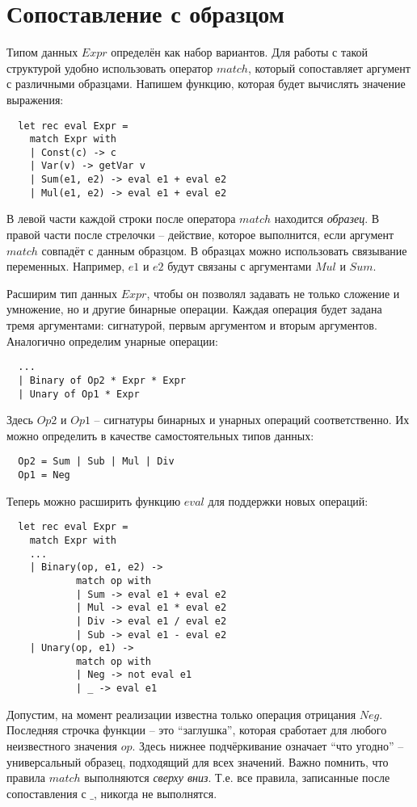 \documentclass[a4paper,11pt]{article}
\begin{document}
\section{Сопоставление с образцом}
Типом данных $Expr$ определён как набор вариантов. Для работы с такой структурой
удобно использовать оператор $match$, который сопоставляет аргумент с различными
образцами. Напишем функцию, которая будет вычислять значение выражения:
\begin{lstlisting}
  let rec eval Expr =
    match Expr with
    | Const(c) -> c
    | Var(v) -> getVar v
    | Sum(e1, e2) -> eval e1 + eval e2
    | Mul(e1, e2) -> eval e1 + eval e2
\end{lstlisting}
В левой части каждой строки после оператора $match$ находится \emph{образец}. В
правой части после стрелочки -- действие, которое выполнится, если аргумент
$match$ совпадёт с данным образцом. В образцах можно использовать связывание
переменных. Например, $e1$ и $e2$ будут связаны с аргументами $Mul$ и $Sum$.

Расширим тип данных $Expr$, чтобы он позволял задавать не только сложение и
умножение, но и другие бинарные операции. Каждая операция будет задана тремя
аргументами: сигнатурой, первым аргументом и вторым аргументов. Аналогично
определим унарные операции:
\begin{lstlisting}
  ...
  | Binary of Op2 * Expr * Expr
  | Unary of Op1 * Expr
\end{lstlisting}
Здесь $Op2$ и $Op1$ -- сигнатуры бинарных и унарных операций соответственно. Их
можно определить в качестве самостоятельных типов данных:
\begin{lstlisting}
  Op2 = Sum | Sub | Mul | Div
  Op1 = Neg
\end{lstlisting}
Теперь можно расширить функцию $eval$ для поддержки новых операций:
\begin{lstlisting}
  let rec eval Expr =
    match Expr with
    ...
    | Binary(op, e1, e2) -> 
            match op with 
            | Sum -> eval e1 + eval e2
            | Mul -> eval e1 * eval e2
            | Div -> eval e1 / eval e2
            | Sub -> eval e1 - eval e2
    | Unary(op, e1) -> 
            match op with 
            | Neg -> not eval e1
            | _ -> eval e1
\end{lstlisting}
Допустим, на момент реализации известна только операция отрицания $Neg$.
Последняя строчка функции -- это ``заглушка'', которая сработает для любого
неизвестного значения $op$. Здесь нижнее подчёркивание означает ``что угодно'' --
универсальный образец, подходящий для всех значений. Важно помнить, что правила
$match$ выполняются \emph{сверху вниз}. Т.е. все правила, записанные после
сопоставления с $\_$, никогда не выполнятся.
\end{document}

